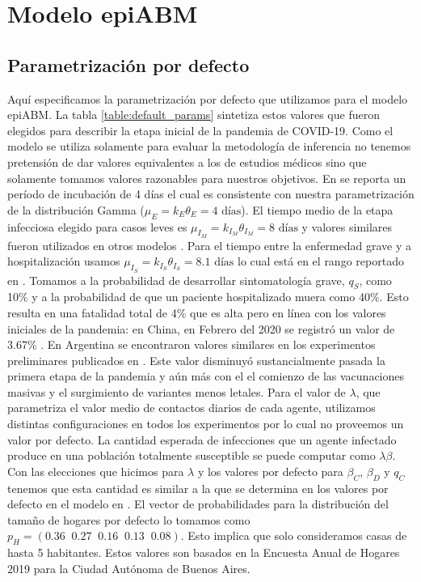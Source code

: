 \chapter{Modelo epiABM}
\section{Parametrización por defecto}\label{appendix:epi_abm_default_params}

Aquí especificamos la parametrización por defecto que utilizamos para el modelo epiABM. La tabla \ref{table:default_params} sintetiza estos valores que fueron elegidos para describir la etapa inicial de la pandemia de COVID-19. Como el modelo se utiliza solamente para evaluar la metodología de inferencia no tenemos pretensión de dar valores equivalentes a los de estudios médicos sino que solamente tomamos valores razonables para nuestros objetivos. En \cite{Guan2020} se reporta un período de incubación de 4 días el cual es consistente con nuestra parametrización de la distribución Gamma ($\mu_E = k_E \theta_E = 4\text{ días}$). El tiempo medio de la etapa infecciosa elegido para casos leves es $\mu_{I_M} = k_{I_M} \theta_{I_M} = 8 \text{ días}$ y valores similares fueron utilizados en otros modelos \citep{Zhao2020, Ivorra2020}. Para el tiempo entre la enfermedad grave y a hospitalización usamos $\mu_{I_S} = k_{I_S} \theta_{I_S} = 8.1 \text{ días}$ lo cual está en el rango reportado en \cite{Faes2020}. Tomamos a la probabilidad de desarrollar sintomatología grave, $q_S$, como 10\% y a la probabilidad de que un paciente hospitalizado muera como 40\%. Esto resulta en una fatalidad total de 4\% que es alta pero en línea con los valores iniciales de la pandemia: en China, en Febrero del 2020 se registró un valor de 3.67\% \citep{Verity2020}. En Argentina se encontraron valores similares en los experimentos preliminares publicados en \cite{Evensen2020}. Este valor disminuyó sustancialmente pasada la primera etapa de la pandemia y aún más con el el comienzo de las vacunaciones masivas y el surgimiento de variantes menos letales. Para el valor de $\lambda$, que parametriza el valor medio de contactos diarios de cada agente, utilizamos distintas configuraciones en todos los experimentos por lo cual no proveemos un valor por defecto. La cantidad esperada de infecciones que un agente infectado produce en una población totalmente susceptible se puede computar como $\lambda \beta$. Con las elecciones que hicimos para $\lambda$ y los valores por defecto para $\beta_C$, $\beta_D$ y $q_C$ tenemos que esta cantidad es similar a la que se determina en los valores por defecto en el modelo en \cite{Kerr2020}. El vector de probabilidades para la distribución del tamaño de hogares por defecto lo tomamos como $p_H = (0.36\;\; 0.27\;\; 0.16\;\; 0.13\;\; 0.08)$. Esto implica que solo consideramos casas de hasta 5 habitantes. Estos valores son basados en la Encuesta Anual de Hogares 2019 para la Ciudad Autónoma de Buenos Aires.


